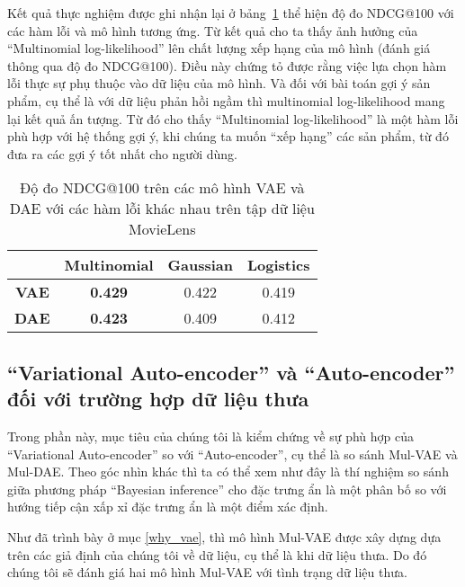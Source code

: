     Kết quả thực nghiệm được ghi nhận lại ở bảng~\ref{table:comparell} thể hiện độ đo NDCG@100 với các hàm lỗi và mô hình tương ứng. 
    Từ kết quả cho ta thấy ảnh hưởng của ``Multinomial log-likelihood'' lên chất lượng xếp hạng của mô hình (đánh giá thông qua độ đo NDCG@100). 
    Điều này chứng tỏ được rằng việc lựa chọn hàm lỗi thực sự phụ thuộc vào dữ liệu của mô hình. 
    Và đối với bài toán gợi ý sản phẩm, cụ thể là với dữ liệu phản hồi ngầm thì multinomial log-likelihood mang lại kết quả ấn tượng. 
    Từ đó cho thấy ``Multinomial log-likelihood'' là một hàm lỗi phù hợp với hệ thống gợi ý, khi chúng ta muốn ``xếp hạng'' các sản phẩm, từ đó đưa ra các gợi ý tốt nhất cho người dùng.            

    \begin{table}[]
    \centering
        \begin{tabular}{|c|c|c|c|}
        \hline
                        & \textbf{Multinomial}                  & \textbf{Gaussian}            & \textbf{Logistics}           \\ \hline
        \textbf{VAE} &  \textbf{0.429} & 0.422 &  0.419 \\ \hline
        \textbf{DAE}  & \textbf{0.423}                        & 0.409                        & 0.412                        \\ \hline
        \end{tabular}
    
    \caption[]{Độ đo NDCG@100 trên các mô hình VAE và DAE với các hàm lỗi khác nhau trên tập dữ liệu MovieLens}
    \label{table:comparell}
    \end{table}



    \subsection{``Variational Auto-encoder'' và ``Auto-encoder'' đối với trường hợp dữ liệu thưa}
    Trong phần này, mục tiêu của  chúng tôi là kiểm chứng về sự phù hợp của ``Variational Auto-encoder'' so với ``Auto-encoder'', cụ thể là so sánh Mul-VAE và Mul-DAE.
    Theo góc nhìn khác thì ta có thể xem như đây là thí nghiệm so sánh giữa phương pháp ``Bayesian inference'' cho đặc trưng ẩn là một phân bố so với hướng tiếp cận xấp xỉ đặc trưng ẩn là một điểm xác định.

    Như đã trình bày ở mục \ref{why_vae}, thì mô hình Mul-VAE được xây dựng dựa trên các giả định của chúng tôi về dữ liệu, cụ thể là khi dữ liệu thưa.
    Do đó chúng tôi sẽ đánh giá hai mô hình Mul-VAE với tình trạng dữ liệu thưa.

